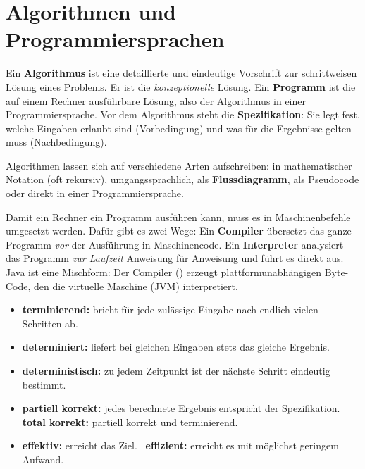 \section{Algorithmen und Programmiersprachen}
\worum
Ein \textbf{Algorithmus} ist eine detaillierte und eindeutige Vorschrift zur schrittweisen Lösung eines Problems. Er ist die \emph{konzeptionelle} Lösung. Ein \textbf{Programm} ist die auf einem Rechner ausführbare Lösung, also der Algorithmus in einer Programmiersprache. Vor dem Algorithmus steht die \textbf{Spezifikation}: Sie legt fest, welche Eingaben erlaubt sind (Vorbedingung) und was für die Ergebnisse gelten muss (Nachbedingung).

Algorithmen lassen sich auf verschiedene Arten aufschreiben: in mathematischer Notation (oft rekursiv), umgangssprachlich, als \textbf{Flussdiagramm}, als Pseudocode oder direkt in einer Programmiersprache.

Damit ein Rechner ein Programm ausführen kann, muss es in Maschinenbefehle umgesetzt werden. Dafür gibt es zwei Wege: Ein \textbf{Compiler} übersetzt das ganze Programm \emph{vor} der Ausführung in Maschinencode. Ein \textbf{Interpreter} analysiert das Programm \emph{zur Laufzeit} Anweisung für Anweisung und führt es direkt aus. Java ist eine Mischform: Der Compiler () erzeugt plattformunabhängigen Byte-Code, den die virtuelle Maschine (JVM) interpretiert.

\begin{merke}
\begin{itemize}[itemsep=0.1em]
\item \textbf{terminierend:} bricht für jede zulässige Eingabe nach endlich vielen Schritten ab.
\item \textbf{determiniert:} liefert bei gleichen Eingaben stets das gleiche Ergebnis.
\item \textbf{deterministisch:} zu jedem Zeitpunkt ist der nächste Schritt eindeutig bestimmt.
\item \textbf{partiell korrekt:} jedes berechnete Ergebnis entspricht der Spezifikation. \\
\textbf{total korrekt:} partiell korrekt und terminierend.
\item \textbf{effektiv:} erreicht das Ziel. \ \textbf{effizient:} erreicht es mit möglichst geringem Aufwand.
\end{itemize}
\end{merke}

